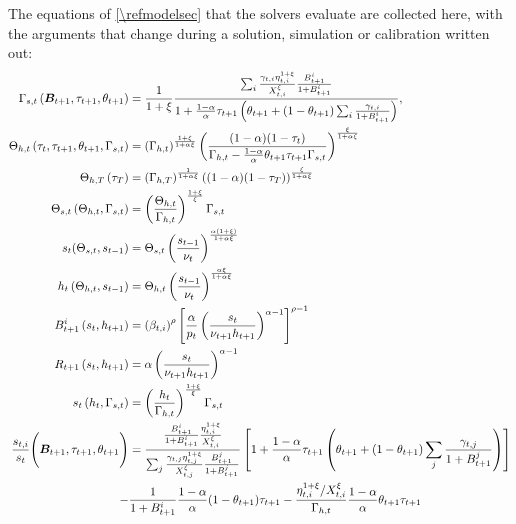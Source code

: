 The equations of \cref{\refmodelsec} that the solvers evaluate are collected here, with the arguments that change during a solution, simulation or calibration written out:
\begin{subequations}\label{\refeq:auxiliary}
    \begin{align}
        \Gamma_{s,t}\left(\bm{B}_{t+1}, \tau_{t+1}, \theta_{t+1} \right) &= \frac{1}{1+\xi}\frac{\sum_i \frac{\gamma_{t,i}\eta_{t,i}^{1+\xi}}{X_{t,i}^{\xi}}\frac{B_{t+1}^i}{1+B_{t+1}^i}}{1+\frac{1-\alpha}{\alpha}\tau_{t+1}\left(\theta_{t+1}+(1-\theta_{t+1})\sum_i\frac{\gamma_{t,i}}{1+B_{t+1}^i}\right)},
        \label{\refeq:auxiliary:Gammas} \\
        \Theta_{h,t}\left(\tau_t, \tau_{t+1}, \theta_{t+1}, \Gamma_{s,t}\right) &= \left(\Gamma_{h,t}\right)^{\frac{1+\xi}{1+\alpha\xi}}\left(\frac{(1-\alpha)(1-\tau_t)}{\Gamma_{h,t}-\frac{1-\alpha}{\alpha}\theta_{t+1}\tau_{t+1}\Gamma_{s,t}}\right)^{\frac{\xi}{1+\alpha\xi}}
        \label{\refeq:auxiliary:Thetah} \\
        \Theta_{h,T}\left(\tau_T\right) &= \left(\Gamma_{h,T}\right)^{\frac{1}{1+\alpha\xi}}\left((1-\alpha)(1-\tau_T)\right)^{\frac{\xi}{1+\alpha\xi}}
        \label{\refeq:auxiliary:ThetahT} \\
        \Theta_{s,t}\left(\Theta_{h,t}, \Gamma_{s,t}\right) &= \left(\frac{\Theta_{h,t}}{\Gamma_{h,t}}\right)^{\frac{1+\xi}{\xi}} \Gamma_{s,t}
        \label{\refeq:auxiliary:Thetas} \\
        s_t(\Theta_{s,t}, s_{t-1}) &= \Theta_{s,t} \left(\frac{s_{t-1}}{\nu_t}\right)^{\frac{\alpha(1+\xi)}{1+\alpha\xi}}
        \label{\refeq:auxiliary:s} \\
        h_t\left(\Theta_{h,t}, s_{t-1}\right) &= \Theta_{h,t}\left(\frac{s_{t-1}}{\nu_t}\right)^{\frac{\alpha\xi}{1+\alpha\xi}} \label{\refeq:auxiliary:h} \\
        B_{t+1}^i\left(s_t, h_{t+1}\right) &=\left(\beta_{t,i}\right)^{\rho}\left[\frac{\alpha}{p_t}\left(\frac{s_t}{\nu_{t+1}h_{t+1}}\right)^{\alpha-1}\right]^{\rho-1}
        \label{\refeq:auxiliary:B} \\
        R_{t+1}\left(s_t, h_{t+1}\right) &= \alpha \left(\frac{s_t}{\nu_{t+1}h_{t+1}}\right)^{\alpha-1} \label{\refeq:auxiliary:R} \\
        s_t\left(h_t, \Gamma_{s,t}\right) &= \left(\frac{h_t}{\Gamma_{h,t}}\right)^{\frac{1+\xi}{\xi}}\Gamma_{s,t}
        \label{\refeq:auxiliary:sFromH} \\
        \frac{s_{t,i}}{s_t}\Bigg(\bm{B}_{t+1}, \tau_{t+1}, \theta_{t+1}\Bigg) &=\frac{\frac{B_{t+1}^i}{1+B_{t+1}^i}\frac{\eta_{t,i}^{1+\xi}}{X_{t,i}^{\xi}}}{\sum_{j} \frac{\gamma_{t,j}\eta_{t,j}^{1+\xi}}{X_{t,j}^{\xi}}\frac{B_{t+1}^j}{1+B_{t+1}^j}}\left[1+\frac{1-\alpha}{\alpha}\tau_{t+1}\left(\theta_{t+1}+(1-\theta_{t+1})\sum_{j}\frac{\gamma_{t,j}}{1+B_{t+1}^j}\right)\right] \notag \\
        -&\frac{1}{1+B_{t+1}^i}\frac{1-\alpha}{\alpha}(1-\theta_{t+1})\tau_{t+1} - \frac{\eta_{t,i}^{1+\xi}/X_{t,i}^{\xi}}{\Gamma_{h,t}}\frac{1-\alpha}{\alpha}\theta_{t+1}\tau_{t+1} \label{\refeq:auxiliary:si_s}
    \end{align}
\end{subequations}
